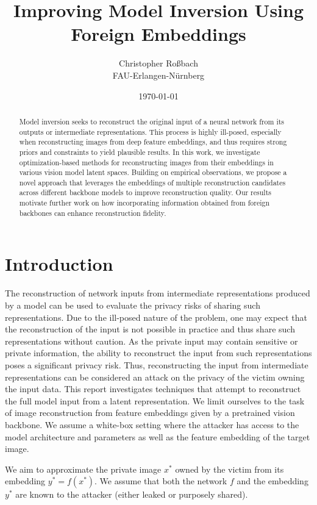 \documentclass[10pt,twocolumn]{article}
\title{Improving Model Inversion Using Foreign Embeddings}
\author{Christopher Roßbach \\ FAU-Erlangen-Nürnberg}
\date{\today}
\begin{document}
\maketitle
\begin{abstract}
    Model inversion seeks to reconstruct the original input of a neural network from its outputs or intermediate representations.
    This process is highly ill-posed, especially when reconstructing images from deep feature embeddings, and thus requires strong priors and constraints to yield plausible results.
    In this work, we investigate optimization-based methods for reconstructing images from their embeddings in various vision model latent spaces.
    Building on empirical observations, we propose a novel approach that leverages the embeddings of multiple reconstruction candidates across different backbone models to improve reconstruction quality.
    Our results motivate further work on how incorporating information obtained from foreign backbones can enhance reconstruction fidelity.
\end{abstract}

\section{Introduction}
The reconstruction of network inputs from intermediate representations produced by a model can be used to evaluate the privacy risks of sharing such representations.
Due to the ill-posed nature of the problem, one may expect that the reconstruction of the input is not possible in practice and thus share such representations without caution.
As the private input may contain sensitive or private information, the ability to reconstruct the input from such representations poses a significant privacy risk.
Thus, reconstructing the input from intermediate representations can be considered an attack on the privacy of the victim owning the input data.
This report investigates techniques that attempt to reconstruct the full model input from a latent representation.
We limit ourselves to the task of image reconstruction from feature embeddings given by a pretrained vision backbone.
We assume a white-box setting where the attacker has access to the model architecture and parameters as well as the feature embedding of the target image.

We aim to approximate the private image $x^*$ owned by the victim from its embedding $y^* = f(x^*)$.
We assume that both the network $f$ and the embedding $y^*$ are known to the attacker (either leaked or purposely shared).
\end{document}
